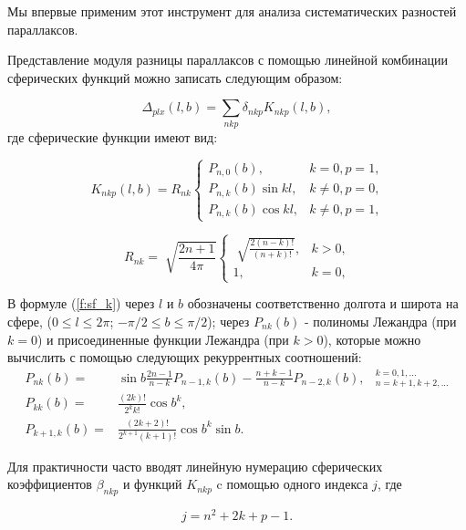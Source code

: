 \documentclass[14pt]{article} %
\begin{document}
Мы впервые применим этот инструмент для анализа систематических разностей параллаксов.
 
Представление модуля разницы параллаксов с помощью линейной комбинации сферических функций можно записать следующим образом:


$$ \Delta_{plx} (l,b) = \sum_{nkp}\delta_{nkp}K_{nkp}(l,b), $$
где сферические функции имеют вид:

\begin{equation}\label{f:sf_k}
K_{nkp}(l,b) = R_{nk} \left\{ \begin{array}{ll}
P_{n,0}(b), & \textrm{$k=0, p=1$,}\\
P_{n,k}(b)\sin{kl}, & \textrm{$k\neq0, p=0$,}\\
P_{n,k}(b)\cos{kl}, & \textrm{$k\neq0, p=1$,}
\end{array} \right.
\end{equation}

\begin{equation}
R_{nk} = \sqrt[]{\frac{2n+1}{4\pi}} \left\{ \begin{array}{cc}
\sqrt[]{\frac{2(n-k)!}{(n+k)!}}, & \textrm{$k>0$,}\\
1, & \textrm{$k=0$,}
\end{array} \right.
\end{equation}

В формуле (\ref{f:sf_k}) через $l$ и $b$ обозначены соответственно долгота и широта на сфере, ($0 \leq l \leq 2\pi$; $-\pi/2\leq b \leq \pi/2$); через $P_{nk}(b)$ - полиномы Лежандра (при $k = 0$) и присоединенные функции Лежандра (при $k > 0$), которые можно вычислить с помощью следующих рекуррентных соотношений:
\begin{equation}
\begin{array}{rll}
P_{nk}(b)=&\sin{b\frac{2n-1}{n-k}}P_{n-1,k}(b)-\frac{n+k-1}{n-k}P_{n-2,k}(b), & {}^{k=0,1,...}_{n=k+1,k+2,...}\\
P_{kk}(b)=&\frac{(2k)!}{2^{k}k!}{\cos{b}}^{k},\\
P_{k+1,k}(b)=&\frac{(2k+2)!}{2^{k+1}(k+1)!}{\cos{b}}^{k}\sin{b}.
\end{array}
\end{equation}

Для практичности часто вводят линейную нумерацию  сферических коэффициентов $\beta_{nkp}$ и функций $K_{nkp}$ c помощью одного индекса $j$, где

\begin{equation}\label{f:sf_j}
j = n^2 + 2k + p -1.
\end{equation}
\end{document}
